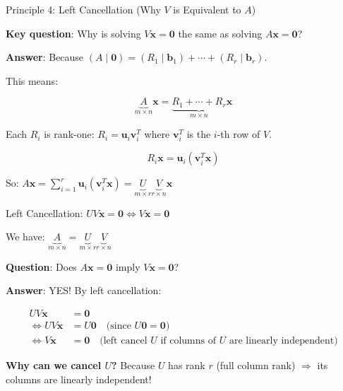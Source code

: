 \documentclass[10pt]{beamer}
\theoremstyle{definition}
\newcommand{\x}[1]{\alert{\textbf{#1}}}
\begin{document}
\begin{frame}{Principle 4: Left Cancellation (Why $V$ is Equivalent to $A$)}

\x{Key question}: Why is solving $V\mathbf{x} = \mathbf{0}$ the same as solving $A\mathbf{x} = \mathbf{0}$?

\vspace{1em}

\x{Answer}: Because $(A \mid \mathbf{0}) = (R_1 \mid \mathbf{b}_1) + \cdots + (R_r \mid \mathbf{b}_r)$.

\vspace{0.5em}

This means:

$$\underbrace{A}_{m \times n} \mathbf{x} = \underbrace{R_1 + \cdots + R_r}_{m \times n} \mathbf{x}$$

\vspace{1em}

Each $R_i$ is rank-one: $R_i = \mathbf{u}_i \mathbf{v}_i^T$ where $\mathbf{v}_i^T$ is the $i$-th row of $V$.

$$R_i \mathbf{x} = \mathbf{u}_i (\mathbf{v}_i^T \mathbf{x})$$

So: $A\mathbf{x} = \sum_{i=1}^r \mathbf{u}_i (\mathbf{v}_i^T \mathbf{x}) = \underbrace{U}_{m \times r} \underbrace{V}_{r \times n} \mathbf{x}$

\end{frame}

\begin{frame}{Left Cancellation: $UV\mathbf{x} = \mathbf{0} \iff V\mathbf{x} = \mathbf{0}$}

We have: $\underbrace{A}_{m \times n} = \underbrace{U}_{m \times r} \underbrace{V}_{r \times n}$

\vspace{1em}

\x{Question}: Does $A\mathbf{x} = \mathbf{0}$ imply $V\mathbf{x} = \mathbf{0}$?

\vspace{0.5em}

\x{Answer}: YES! By left cancellation:

\begin{align*}
UV\mathbf{x} &= \mathbf{0} \\
\iff UV\mathbf{x} &= U\mathbf{0} \quad \text{(since $U\mathbf{0} = \mathbf{0}$)} \\
\iff V\mathbf{x} &= \mathbf{0} \quad \text{(left cancel $U$ if columns of $U$ are linearly independent)}
\end{align*}

\vspace{1em}

\x{Why can we cancel $U$?} Because $U$ has rank $r$ (full column rank) $\Rightarrow$ its columns are linearly independent!

\end{frame}
\end{document}
